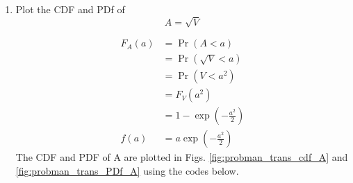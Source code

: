 \documentclass[10pt, a4paper]{article}
\begin{document}
\begin{enumerate}
\begin{center}
\end{center}





%
%
\item
\label{ch3_raleigh_sim}
Plot the CDF and PDf of
%
\begin{equation}
A = \sqrt{V}
\end{equation}

$$
\begin{aligned}
F_A(a) & =\Pr{\left(A<a\right) } \\
& =\Pr{\left(\sqrt{V}<a\right)} \\
& =\Pr{\left(V<a^2\right)} \\
& =F_V\left(a^2\right) \\
& =1-\exp \left(-\frac{a^2}{2}\right)\\
f(a)&=a \exp \left(-\frac{a^2}{2}\right)
\end{aligned}
$$
 The CDF and PDF of A are plotted in Figs. \ref{fig:probman_trans_cdf_A} and \ref{fig:probman_trans_PDf_A}
using the codes below.


\end{enumerate}
\end{document}
